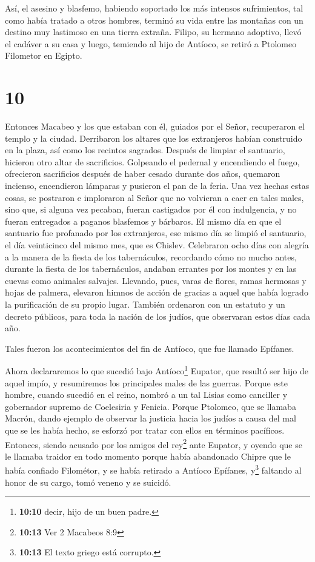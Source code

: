  Así, el asesino y blasfemo, habiendo soportado los más
intensos sufrimientos, tal como había tratado a otros hombres, terminó
su vida entre las montañas con un destino muy lastimoso en una tierra
extraña.  Filipo, su hermano adoptivo, llevó el cadáver a
su casa y luego, temiendo al hijo de Antíoco, se retiró a Ptolomeo
Filometor en Egipto.

\hypertarget{section-9}{%
\section{10}\label{section-9}}

 Entonces Macabeo y los que estaban con él, guiados por el
Señor, recuperaron el templo y la ciudad.  Derribaron los
altares que los extranjeros habían construido en la plaza, así como los
recintos sagrados.  Después de limpiar el santuario,
hicieron otro altar de sacrificios. Golpeando el pedernal y encendiendo
el fuego, ofrecieron sacrificios después de haber cesado durante dos
años, quemaron incienso, encendieron lámparas y pusieron el pan de la
feria.  Una vez hechas estas cosas, se postraron e
imploraron al Señor que no volvieran a caer en tales males, sino que, si
alguna vez pecaban, fueran castigados por él con indulgencia, y no
fueran entregados a paganos blasfemos y bárbaros.  El
mismo día en que el santuario fue profanado por los extranjeros, ese
mismo día se limpió el santuario, el día veinticinco del mismo mes, que
es Chislev.  Celebraron ocho días con alegría a la manera
de la fiesta de los tabernáculos, recordando cómo no mucho antes,
durante la fiesta de los tabernáculos, andaban errantes por los montes y
en las cuevas como animales salvajes.  Llevando, pues,
varas de flores, ramas hermosas y hojas de palmera, elevaron himnos de
acción de gracias a aquel que había logrado la purificación de su propio
lugar.  También ordenaron con un estatuto y un decreto
públicos, para toda la nación de los judíos, que observaran estos días
cada año.

 Tales fueron los acontecimientos del fin de Antíoco, que
fue llamado Epífanes.

 Ahora declararemos lo que sucedió bajo
Antíoco\footnote{\textbf{10:10} decir, hijo de un buen padre.} Eupator,
que resultó ser hijo de aquel impío, y resumiremos los principales males
de las guerras.  Porque este hombre, cuando sucedió en el
reino, nombró a un tal Lisias como canciller y gobernador supremo de
Coelesiria y Fenicia.  Porque Ptolomeo, que se llamaba
Macrón, dando ejemplo de observar la justicia hacia los judíos a causa
del mal que se les había hecho, se esforzó por tratar con ellos en
términos pacíficos.  Entonces, siendo acusado por los
amigos del rey\footnote{\textbf{10:13} Ver 2 Macabeos 8:9} ante Eupator,
y oyendo que se le llamaba traidor en todo momento porque había
abandonado Chipre que le había confiado Filométor, y se había retirado a
Antíoco Epífanes, y\footnote{\textbf{10:13} El texto griego está
  corrupto.} faltando al honor de su cargo, tomó veneno y se suicidó.

